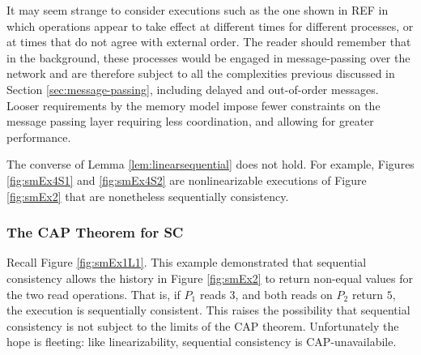 \documentclass[]             %
{NASA}                       %
\theoremstyle{definition}
\begin{document}
It may seem strange to consider executions such as the one shown in
REF in which operations appear to take effect at different times for
different processes, or at times that do not agree with external
order. The reader should remember that in the background, these
processes would be engaged in message-passing over the network and are
therefore subject to all the complexities previous discussed in
Section \ref{sec:message-passing}, including delayed and out-of-order
messages. Looser requirements by the memory model impose fewer
constraints on the message passing layer requiring less coordination,
and allowing for greater performance.

The converse of Lemma \ref{lem:linearsequential} does not hold. For
example, Figures \ref{fig:smEx4S1} and \ref{fig:smEx4S2} are
nonlinearizable executions of Figure \ref{fig:smEx2} that are
nonetheless sequentially consistency.

\subsubsection{The CAP Theorem for SC}

Recall Figure \ref{fig:smEx1L1}. This example demonstrated that
sequential consistency allows the history in Figure \ref{fig:smEx2} to
return non-equal values for the two read operations. That is, if $P_1$
reads $3$, and both reads on $P_2$ return $5$, the execution is
sequentially consistent. This raises the possibility that sequential
consistency is not subject to the limits of the CAP
theorem. Unfortunately the hope is fleeting: like linearizability,
sequential consistency is CAP-unavailabile.
\end{document}
